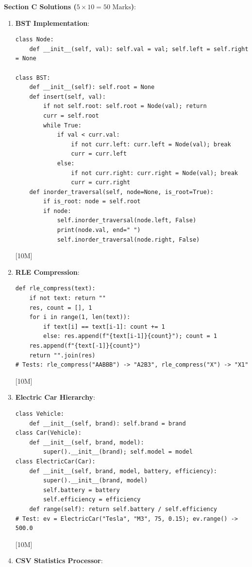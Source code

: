 \begin{solutionbox}
\medskip
\noindent\textbf{Section C Solutions ($5 \times 10 = 50\text{ Marks}$)}:
\begin{enumerate}[start=17]
    \item \textbf{BST Implementation}:
    \begin{lstlisting}[language=Python3]
class Node:
    def __init__(self, val): self.val = val; self.left = self.right = None

class BST:
    def __init__(self): self.root = None
    def insert(self, val):
        if not self.root: self.root = Node(val); return
        curr = self.root
        while True:
            if val < curr.val:
                if not curr.left: curr.left = Node(val); break
                curr = curr.left
            else:
                if not curr.right: curr.right = Node(val); break
                curr = curr.right
    def inorder_traversal(self, node=None, is_root=True):
        if is_root: node = self.root
        if node:
            self.inorder_traversal(node.left, False)
            print(node.val, end=" ")
            self.inorder_traversal(node.right, False)
    \end{lstlisting} [10M]
    \item \textbf{RLE Compression}:
    \begin{lstlisting}[language=Python3]
def rle_compress(text):
    if not text: return ""
    res, count = [], 1
    for i in range(1, len(text)):
        if text[i] == text[i-1]: count += 1
        else: res.append(f"{text[i-1]}{count}"); count = 1
    res.append(f"{text[-1]}{count}")
    return "".join(res)
# Tests: rle_compress("AABBB") -> "A2B3", rle_compress("X") -> "X1"
    \end{lstlisting} [10M]
    \item \textbf{Electric Car Hierarchy}:
    \begin{lstlisting}[language=Python3]
class Vehicle:
    def __init__(self, brand): self.brand = brand
class Car(Vehicle):
    def __init__(self, brand, model):
        super().__init__(brand); self.model = model
class ElectricCar(Car):
    def __init__(self, brand, model, battery, efficiency):
        super().__init__(brand, model)
        self.battery = battery
        self.efficiency = efficiency
    def range(self): return self.battery / self.efficiency
# Test: ev = ElectricCar("Tesla", "M3", 75, 0.15); ev.range() -> 500.0
    \end{lstlisting} [10M]
    \item \textbf{CSV Statistics Processor}:
    \begin{lstlisting}[language=Python3]

\end{lstlisting}
\end{enumerate}
\end{solutionbox}
